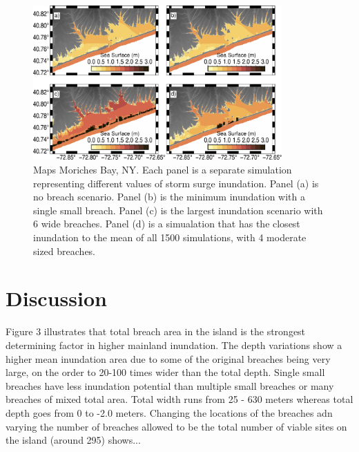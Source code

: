\documentclass{coastal_paper}
\begin{document}
\begin{figure}
    \centering
    \includegraphics[width=0.85\textwidth]{min_max_mean_inundation.pdf}
    \caption{Maps Moriches Bay, NY. Each panel is a separate simulation representing different values of storm surge inundation. Panel (a) is no breach scenario. Panel (b) is the minimum inundation with a single small breach. Panel (c) is the largest inundation scenario with 6 wide breaches. Panel (d)  is a simualation that has the closest inundation to the mean of all 1500 simulations, with 4 moderate sized breaches.}
    \label{fig6}
\end{figure}



\section{Discussion}
Figure 3 illustrates that total breach area in the island is the strongest determining factor in higher mainland inundation. The depth variations show a higher mean inundation area due to some of the original breaches being very large, on the order to 20-100 times wider than the total depth. Single small breaches have less inundation potential than multiple small breaches or many breaches of mixed total area. Total width runs from 25 - 630 meters whereas total depth goes from 0 to -2.0 meters. 
Changing the locations of the breaches adn varying the number of breaches allowed to be the total number of viable sites on the island (around 295) shows...%
\end{document}
